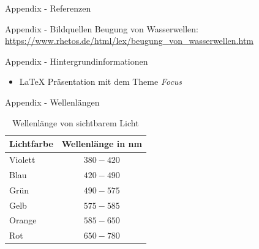 \documentclass{beamer}
\begin{document}

\appendix

\begin{frame}{Appendix - Referenzen}
    \nocite{*} %
    
    
\end{frame}

\begin{frame}{Appendix - Bildquellen}
    Beugung von Wasserwellen: \\
    \url{https://www.rhetos.de/html/lex/beugung_von_wasserwellen.htm}
\end{frame}

\begin{frame}{Appendix - Hintergrundinformationen}
    \begin{itemize}
        \item \LaTeX{} Präsentation mit dem Theme \emph{Focus}
    \end{itemize}

\end{frame}

\begin{frame}{Appendix - Wellenlängen}
    \begin{table}
        \centering %
        \begin{tabular}{l c}
            \toprule
            Lichtfarbe & Wellenlänge in nm \\
            \toprule
            Violett    & $380 - 420$       \\
            Blau       & $420 - 490$       \\
            Grün       & $490 - 575$       \\
            Gelb       & $575 - 585$       \\
            Orange     & $585 - 650$       \\
            Rot        & $650 - 780$       \\
            \bottomrule
        \end{tabular}
        \caption{Wellenlänge von sichtbarem Licht}
    \end{table}
\end{frame}

\end{document}
